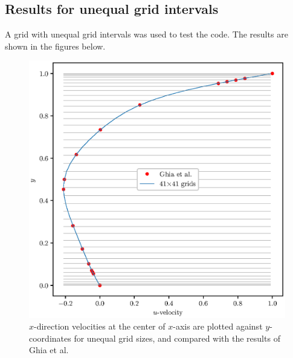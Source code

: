 \documentclass[12pt,a4paper,fleqn]{article}
\begin{document}
\pagebreak

\subsection{Results for unequal grid intervals}
A grid with unequal grid intervals was used to test the code. The results are shown in the figures below.

\begin{figure}[H]
    \centering
    \includegraphics[width=\linewidth]{unequal_cavityFlowU.eps}
    \caption{\(x\)-direction velocities at the center of \(x\)-axis are plotted against \(y\)-coordinates for unequal grid sizes, and compared with the results of Ghia et al.}
\end{figure}
\end{document}

